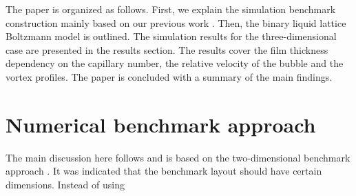 \documentclass{article}
\begin{document}
The paper is organized as follows.  First, we explain the simulation benchmark construction
mainly based on our previous work \cite{kuzmin-binary2d}. Then, the binary liquid lattice
Boltzmann model is outlined. The simulation results for the three-dimensional case are presented in
the results section. The results cover the film thickness dependency on the capillary number, the
relative velocity of the bubble and the vortex profiles. The paper
is concluded with a summary of the main findings.

\section{Numerical benchmark approach}
\label{sec:numerical:benchmark}
The main discussion here follows and is based on the two-dimensional benchmark approach
\cite{kuzmin-binary2d}. It was indicated that the benchmark layout should have certain
dimensions. Instead of using 
\end{document}
